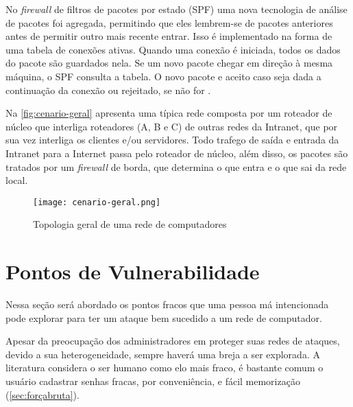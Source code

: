 No \textit{firewall} de filtros de pacotes por estado (SPF) uma nova tecnologia de análise de pacotes foi agregada, permitindo que eles lembrem-se de pacotes anteriores antes de permitir outro mais recente entrar. Isso é implementado na forma de uma tabela de conexões ativas. Quando uma conexão é iniciada, todos os dados do pacote são guardados nela. Se um novo pacote chegar em direção à mesma máquina, o SPF consulta a tabela. O novo pacote e aceito caso seja dada a continuação da conexão ou rejeitado, se não for \cite{univhacker}.

Na \autoref{fig:cenario-geral} apresenta uma típica rede composta por um roteador de núcleo que interliga roteadores (A, B e C) de outras redes da Intranet, que por sua vez interliga os clientes e/ou servidores. Todo trafego de saída e entrada da Intranet para a Internet passa pelo roteador de núcleo, além disso, os pacotes são tratados por um \textit{firewall} de borda, que determina o que entra e o que sai da rede local.

\begin{figure}[!htb]
    \centering
    \caption{Topologia geral de uma rede de computadores} 
    \texttt{[image: cenario-geral.png]}
    \label{fig:cenario-geral}
\end{figure}

\section{Pontos de Vulnerabilidade} \label{sec:pontos-vulnerabilidade}

Nessa seção será abordado os pontos fracos que uma pessoa má intencionada pode explorar para ter um ataque bem sucedido a um rede de computador.

Apesar da preocupação dos administradores em proteger suas redes de ataques, devido a sua heterogeneidade, sempre haverá uma breja a ser explorada. A literatura considera o ser humano como elo mais fraco, é bastante comum o usuário cadastrar senhas fracas, por conveniência, e fácil memorização (\autoref{sec:forçabruta}).

